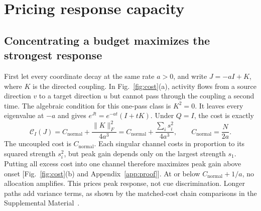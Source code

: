 \documentclass[aps,10pt,onecolumn,superscriptaddress,nofootinbib,longbibliography,
  amsmath,amssymb,floatfix]{revtex4-2}
\newcommand{\Cnoise}{\mathcal C}
\begin{document}
\section{Pricing response capacity}
\label{sec:law}

\subsection{Concentrating a budget maximizes the strongest response}

First let every coordinate decay at the same rate \(a>0\), and write
\(J=-aI+K\), where \(K\) is the directed coupling. In
Fig.~\ref{fig:cost}(a), activity flows from a source direction \(v\)
to a target direction \(u\) but cannot pass through the coupling a
second time. The algebraic condition for this one-pass class is
\(K^2=0\). It leaves every eigenvalue at \(-a\) and gives
\(e^{Jt}=e^{-at}(I+tK)\).
Under \(Q=I\), the cost is exactly
\begin{equation}
  \Cnoise_I(J)=C_{\mathrm{normal}}+
       \frac{\|K\|_F^2}{4a^3}
       = C_{\mathrm{normal}}+\frac{\sum_i s_i^2}{4a^3},
  \qquad C_{\mathrm{normal}}=\frac{N}{2a}.
  \label{eq:cost}
\end{equation}
The uncoupled cost is \(C_{\mathrm{normal}}\). Each singular
channel costs in proportion to its squared strength \(s_i^2\),
but peak gain depends only on the largest strength \(s_1\).
Putting all excess cost into one channel therefore maximizes peak
gain above onset [Fig.~\ref{fig:cost}(b) and
Appendix~\ref{app:proof}]. At or below
\(C_{\mathrm{normal}}+1/a\), no allocation amplifies. This prices
peak response, not cue discrimination. Longer paths add variance
terms, as shown by the matched-cost chain comparisons in the
Supplemental Material~\cite{prrSupplement}.
\end{document}
